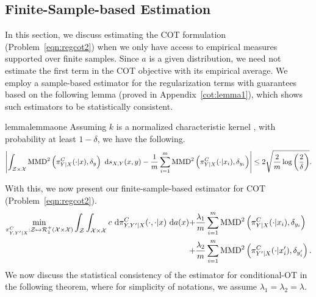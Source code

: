 \subsection{Finite-Sample-based Estimation}
In this section, we discuss estimating the COT formulation (Problem~\ref{eqn:regcot2}) when we only have access to empirical measures supported over finite samples. Since $a$ is a given distribution, we need not estimate the first term in the COT objective with its empirical average. We employ a sample-based estimator for the regularization terms with guarantees based on the following lemma (proved in Appendix~\ref{cot:lemma1}), which shows such estimators to be statistically consistent.
\begin{lemmaBox}
\begin{restatable}{lemma}{lemmaone}\label{lemma}
Assuming $k$ is a normalized characteristic kernel \citep{SriperumbudurFL11}, with probability at least $1-\delta$, we have the following.
\footnotesize{\begin{align*}
\left|\int_{\mathcal{Z}\times\mathcal{X}}\textup{MMD}^2\left(\pi^C_{Y|X}(\cdot|x), \delta_y\right)~ \textup{d}s_{X, Y}(x, y)-\frac{1}{m}\sum\limits_{i=1}^m\textup{MMD}^2\left(\pi^C_{Y|X}(\cdot|x_i), \delta_{y_i}\right) \right|
\le 2\sqrt{\frac{2}{m}\log\left(\frac{2}{\delta}\right)}.
\end{align*}}
\end{restatable}
\end{lemmaBox}
With this, we now present our finite-sample-based estimator for COT (Problem~\ref{eqn:regcot2}).
\begin{align}\label{eqn:empcot2}
\min\limits_{\pi^C_{Y, Y'|X}:\mathcal{Z}\mapsto\mathcal{R}_1^+(\mathcal{X}\times\mathcal{X})}\int_{\mathcal{Z}}\int_{\mathcal{X}\times\mathcal{X}} c\ \textup{d}\pi^C_{Y, Y'|X}(\cdot, \cdot|x)\ \textup{d}a(x) 
+&\frac{\lambda_1}{m}\sum_{i=1}^m\textup{MMD}^2\left(\pi^C_{Y|X}(\cdot|x_i), \delta_{y_i}\right) \nonumber\\
+&\frac{\lambda_2}{m}\sum_{i=1}^m\textup{MMD}^2\left(\pi^C_{Y'|X}(\cdot|x'_i), \delta_{y'_i}\right).
\end{align}
We now discuss the statistical consistency of the estimator for conditional-OT in the following theorem, where for simplicity of notations, we assume $\lambda_1=\lambda_2=\lambda$.
